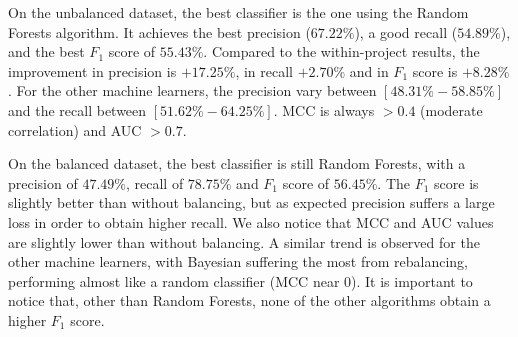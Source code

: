 On the unbalanced dataset, the best classifier is the one using the Random Forests algorithm. It achieves the best precision ($67.22\%$), a good recall ($54.89\%$), and the best $F_{1}$ score of $55.43\%$. Compared to the within-project results, the improvement in precision is $+17.25\%$, in recall $+2.70\%$ and in $F_1$ score is $+8.28\%$. For the other machine learners, the precision vary between $[48.31\%-58.85\%]$ and the recall between $[51.62\%-64.25\%]$. MCC is always $>0.4$ (moderate correlation) and AUC $>0.7$.

On the balanced dataset, the best classifier is still Random Forests, with a precision of $47.49\%$, recall of $78.75\%$ and $F_{1}$ score of $56.45\%$. The $F_{1}$ score is slightly better than without balancing, but as expected precision suffers a large loss in order to obtain higher recall. We also notice that MCC and AUC values are slightly lower than without balancing. A similar trend is observed for the other machine learners, with Bayesian suffering the most from rebalancing, performing almost like a random classifier (MCC near $0$). It is important to notice that, other than Random Forests, none of the other algorithms obtain a higher $F_1$ score.

